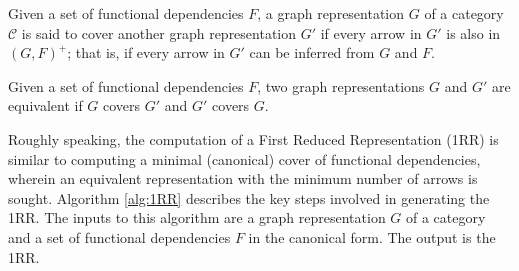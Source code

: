 






\begin{definition}
Given a set of functional dependencies $F$,  a graph representation $G$ of a category $\mathcal{C}$ is said to cover another graph representation $G'$  if every arrow in $G'$ is also in $(G,F)^+$; that is, if every arrow in $G'$ can be inferred from $G$ and $F$. 
\end{definition}

\begin{definition}
    Given a set of functional dependencies $F$, two graph representations $G$ and $G'$ are equivalent if $G$ covers $G'$ and $G'$ covers $G$. 
\end{definition}

 Roughly speaking, the computation of a First Reduced Representation (1RR) is similar to computing a minimal (canonical) cover of functional dependencies,  wherein an equivalent representation with the minimum number of arrows is sought. Algorithm \ref{alg:1RR} describes the key steps involved in generating the 1RR. The inputs to this algorithm are a graph representation $G$ of a category and a set of functional dependencies $F$ in the canonical form. The output is the 1RR.



